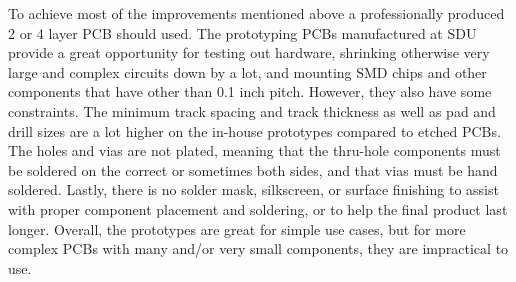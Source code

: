 \documentclass[11pt]{article}
\begin{document}
To achieve most of the improvements mentioned above a professionally produced 2 or 4 layer PCB should used. The prototyping PCBs manufactured at SDU provide a great opportunity for testing out hardware, shrinking otherwise very large and complex circuits down by a lot, and mounting SMD chips and other components that have other than 0.1 inch pitch. However, they also have some constraints. The minimum track spacing and track thickness as well as pad and drill sizes are a lot higher on the in-house prototypes compared to etched PCBs. The holes and vias are not plated, meaning that the thru-hole components must be soldered on the correct or sometimes both sides, and that vias must be hand soldered. Lastly, there is no solder mask, silkscreen, or surface finishing to assist with proper component placement and soldering, or to help the final product last longer. Overall, the prototypes are great for simple use cases, but for more complex PCBs with many and/or very small components, they are impractical to use.
\end{document}
